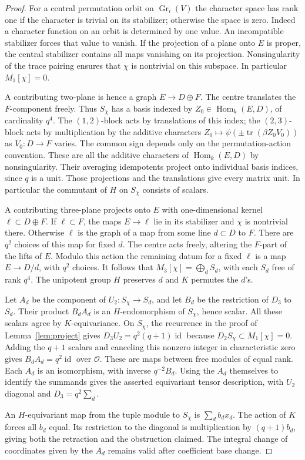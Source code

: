 \documentclass[11pt]{article}
\newcommand{\Gr}{\operatorname{Gr}}
\newcommand{\Hom}{\operatorname{Hom}}
\newcommand{\tr}{\operatorname{tr}}
\begin{document}
\begin{proof}
For a central permutation orbit on $\Gr_i(V)$ the character space
has rank one if the character is trivial on its stabilizer; otherwise
the space is zero. Indeed a character function on an orbit is
determined by one value. An incompatible stabilizer forces that value
to vanish. If the projection of a plane onto $E$ is proper, the central
stabilizer contains all maps vanishing on its projection. Nonsingularity
of the trace pairing ensures that $\chi$ is nontrivial on this
subspace. In particular $M_1[\chi]=0$.

A contributing two-plane is hence a graph $E\to D\oplus F$.
The centre translates the $F$-component freely. Thus $S_\chi$ has
a basis indexed by $Z_0\in\Hom_k(E,D)$, of cardinality $q^4$. The
$(1,2)$-block acts by translations of this index; the $(2,3)$-block
acts by multiplication by the additive characters
$Z_0\mapsto\psi(\pm\tr(\beta Z_0V_0))$ as $V_0:D\to F$ varies.
The common sign depends only on the permutation-action convention.
These are all the additive characters of $\Hom_k(E,D)$ by
nonsingularity. Their averaging idempotents project onto individual
basis indices, since $q$ is a unit. Those projections and the
translations give every matrix unit. In particular the commutant of
$H$ on $S_\chi$ consists of scalars.

A contributing three-plane projects onto $E$ with one-dimensional
kernel $\ell\subset D\oplus F$. If $\ell\subset F$, the maps
$E\to\ell$ lie in its stabilizer and $\chi$ is nontrivial there.
Otherwise $\ell$ is the graph of a map from some line $d\subset D$
to $F$. There are $q^2$ choices of this map for fixed $d$. The centre
acts freely, altering the $F$-part of the lifts of $E$.
Modulo this action the remaining datum for a fixed $\ell$ is a map
$E\to D/d$, with $q^2$ choices. It follows that
$M_3[\chi]=\bigoplus_d S_d$, with each $S_d$ free of rank $q^4$.
The unipotent group $H$ preserves $d$ and $K$ permutes the $d$'s.

Let $A_d$ be the component of $U_2:S_\chi\to S_d$, and let $B_d$
be the restriction of $D_3$ to $S_d$. Their product $B_dA_d$ is
an $H$-endomorphism of $S_\chi$, hence scalar. All these scalars
agree by $K$-equivariance. On $S_\chi$, the recurrence in the proof of
Lemma~\ref{lem:project} gives $D_3U_2=q^2(q+1)\operatorname{id}$
because $D_2S_\chi\subset M_1[\chi]=0$. Adding the $q+1$
scalars and canceling this nonzero integer in characteristic zero
gives $B_dA_d=q^2\operatorname{id}$ over $\mathcal O$. These are
maps between free modules of equal rank. Each $A_d$ is an
isomorphism, with inverse $q^{-2}B_d$. Using the $A_d$ themselves
to identify the summands gives the asserted equivariant tensor
description, with $U_2$ diagonal and $D_3=q^2\sum_d$.

An $H$-equivariant map from the tuple module to $S_\chi$ is
$\sum_d b_dx_d$. The action of $K$ forces all $b_d$ equal. Its
restriction to the diagonal is multiplication by $(q+1)b_d$,
giving both the retraction and the obstruction claimed. The
integral change of coordinates given by the $A_d$ remains valid
after coefficient base change.
\end{proof}
\end{document}

